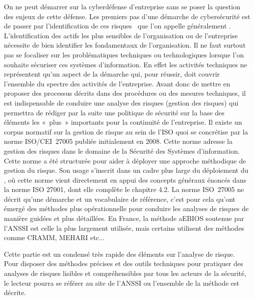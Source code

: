 On ne peut démarrer sur la cyberdéfense d’entreprise sans se poser la question des enjeux de cette défense. Les premiers pas d’une démarche de cybersécurité est de passer  par l’identification de ces risques  que l’on appelle généralement .
L’identification des actifs les plus sensibles de l’organisation ou de l’entreprise nécessite de bien identifier les fondamentaux de l’organisation.
Il ne faut surtout pas se focaliser sur les problématiques techniques ou technologiques lorsque l’on souhaite sécuriser ces systèmes d’information. En effet les activités techniques   ne représentent qu’un aspect de la  démarche qui, pour réussir, doit couvrir l’ensemble du spectre des  activités de l'entreprise.
Avant donc de mettre en proposer des processus décrits dans des procédures ou des mesures techniques, il est indispensable de conduire une analyse des risques (gestion des risques) qui permettra de rédiger par la suite une politique de sécurité sur la base des éléments les « plus » importants pour la continuité de l’entreprise.
Il existe un corpus normatif sur la gestion de risque au sein de l’ISO quoi se concrétise par la norme ISO/CEI~27005 publiée initialement en 2008. Cette norme adresse la gestion des risques dans le domaine de la Sécurité des Systèmes d'information.
Cette norme a été structurée pour aider à déployer une approche méthodique de gestion du risque. Son usage s’inscrit dans un cadre plus large du déploiement du ,  où cette norme vient directement en appui des concepts généraux énoncés dans la norme ISO 27001, dont elle complète le chapitre 4.2.
La norme ISO~27005 ne décrit qu'une démarche et un vocabulaire de référence, c’est pour cela qu’ont émergé des méthodes plus opérationnelle pour conduire les analyses de risques de manière guidées et plus détaillées. En France, la méthode \gls{aEBIOS} soutenue par l’ANSSI est celle la plus largement utilisée, mais certains utilisent des méthodes comme CRAMM, MEHARI etc...

Cette partie est un condensé très rapide des éléments sur l'analyse de risque. Pour disposer des méthodes précises et des outils techniques pour pratiquer des analyses de risques lisibles et compréhensibles par tous les acteurs de la sécurité, le lecteur pourra se référer au site de l’ANSSI ou l’ensemble de la méthode  est décrite.\\

